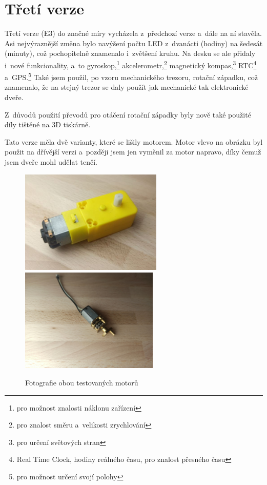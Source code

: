 \section{Třetí verze}
\label{E3-vyvoj}

Třetí verze (E3) do značné míry vycházela z~předchozí verze a~dále na ní stavěla. Asi nejvýraznější změna bylo navýšení počtu 
LED z~dvanácti (hodiny) na šedesát (minuty), což pochopitelně znamenalo i~zvětšení kruhu. Na desku se ale přidaly i~nové funkcionality,
a~to gyroskop,\footnote{pro možnost znalosti náklonu zařízení} akcelerometr,\footnote{pro znalost směru a~velikosti zrychlování} magnetický kompas,\footnote{pro určení světových
stran} RTC\footnote{Real Time Clock, hodiny reálného času, pro znalost přesného času} a~GPS.\footnote{pro možnost určení svojí polohy}
Také jsem použil, po vzoru mechanického trezoru, rotační západku, což znamenalo, že na stejný trezor se daly použít jak mechanické tak 
elektronické dveře.

Z~důvodů použití převodů pro otáčení rotační západky byly nově také použité díly tištěné na 3D tiskárně. 

Tato verze měla dvě varianty, které se lišily motorem.
Motor vlevo na obrázku  byl použit na dřívější verzi a~později jsem jen vyměnil za motor napravo, 
díky čemuž jsem dveře mohl udělat tenčí. %
\begin{figure}[htbp]
    \centering
    \includegraphics[height=140pt]{kapitoly/obrazky/E3/motory/zluty_motor.jpg}
    \includegraphics[height=140pt]{kapitoly/obrazky/E3/motory/hodinovyStrojek.jpg}
    \caption{Fotografie obou testovaných motorů} 
    \label{fig:E3-motory}
\end{figure}